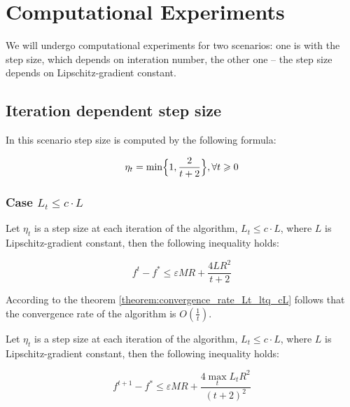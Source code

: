 \documentclass[runningheads, final]{llncs}
\begin{document}
\section{Computational Experiments}\label{sec:experiments}

We will undergo computational experiments for two scenarios: one is with
the step size, which depends on interation number, the other one -- the step
size depends on Lipschitz-gradient constant.

\subsection{Iteration dependent step size}

In this scenario step size is computed by the following formula:

\begin{equation}
    \eta_t = \min \Bigl\{1, \frac{2}{t + 2}\Bigr\}, \forall t \geqslant 0
\end{equation}

\subsubsection{Case $L_t \leqslant c \cdot L$}

\begin{theorem}\label{theorem:convergence_rate_Lt_ltq_cL}
    Let $\eta_t$ is a step size at each iteration of the algorithm,
    $L_t \leqslant c \cdot L$, where
    $L$ is Lipschitz-gradient constant, then the following inequality holds:

    \begin{equation}
        f^{t} - f^{*} \leqslant \varepsilon M R + \frac{4 L R^2}{t+2}
    \end{equation}
\end{theorem}

According to the theorem \ref{theorem:convergence_rate_Lt_ltq_cL} follows that
the convergence rate of the algorithm is $O(\frac{1}{t})$.

\begin{theorem}
    \label{theorem:stopping_criterion}
    Let $\eta_t$ is a step size at each iteration of the algorithm,
    $L_t \leqslant c \cdot L$, where
    $L$ is Lipschitz-gradient constant, then the following inequality holds:

    \begin{equation}
        f^{t + 1} - f^{*} \leqslant \varepsilon M R +
        \frac{4 \max\limits_{t} L_t R^2}{(t+2)^2}
    \end{equation}
\end{theorem}
\end{document}
